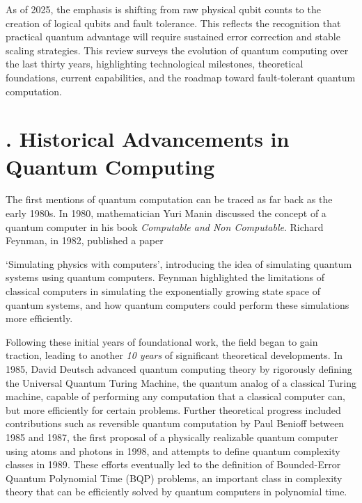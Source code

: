 \documentclass{elbioimp2}
\begin{document}
As of 2025, the emphasis is shifting from raw physical qubit counts to the creation of
logical qubits and fault tolerance. This reflects the recognition that practical quantum
advantage will require sustained error correction and stable scaling strategies. This review
surveys the evolution of quantum computing over the last thirty years, highlighting technological
milestones, theoretical foundations, current capabilities, and the roadmap toward fault-tolerant
quantum computation.

\section{. Historical Advancements in Quantum Computing}
The first mentions of quantum computation can be traced as far back as the early 1980s.
In 1980, mathematician Yuri Manin discussed the concept of a quantum computer in his book \textit{Computable and Non Computable}\cite{Manin1980}. Richard Feynman, in 1982, published a paper

`Simulating physics with computers', introducing the idea of simulating quantum systems using quantum computers\cite{Feynman1982}. Feynman highlighted the limitations of classical computers in simulating the exponentially growing state space of quantum systems, and how quantum computers could perform these simulations more efficiently.


Following these initial years of foundational work, the field began to gain traction, leading to another \textit{10 years} of significant theoretical developments. In 1985, David Deutsch advanced quantum computing theory by rigorously defining the Universal Quantum Turing Machine, the quantum analog of a classical Turing machine, capable of performing any computation that a classical computer can, but more efficiently for certain problems\cite{Deutsch1985}.
Further theoretical progress included contributions such as reversible quantum computation by Paul Benioff between 1985 and 1987\cite{benioff1986}, the first proposal of a physically realizable quantum computer using atoms and photons in 1998\cite{Igeta:88}, and attempts to define quantum complexity classes in 1989\cite{10.1145/167088.167097}. These efforts eventually led to the definition of Bounded-Error Quantum Polynomial Time (BQP) problems, an important class in complexity theory that can be efficiently solved by quantum computers in polynomial time.
\end{document}
